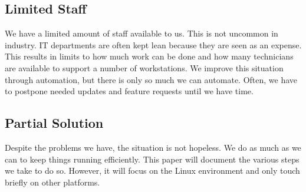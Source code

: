 \subsection{Limited Staff}
We have a limited amount of staff available to us.  This is not uncommon in industry.  IT departments are often kept lean because they are seen as an expense.  This results in limits to how much work can be done and how many technicians are available to support a number of workstations.  We improve this situation through automation, but there is only so much we can automate.  Often, we have to postpone needed updates and feature requests until we have time.   

\subsection{Partial Solution}
Despite the problems we have, the situation is not hopeless.  We do as much as we can to keep things running efficiently.  This paper will document the various steps we take to do so.  However, it will focus on the Linux environment and only touch briefly on other platforms.  
